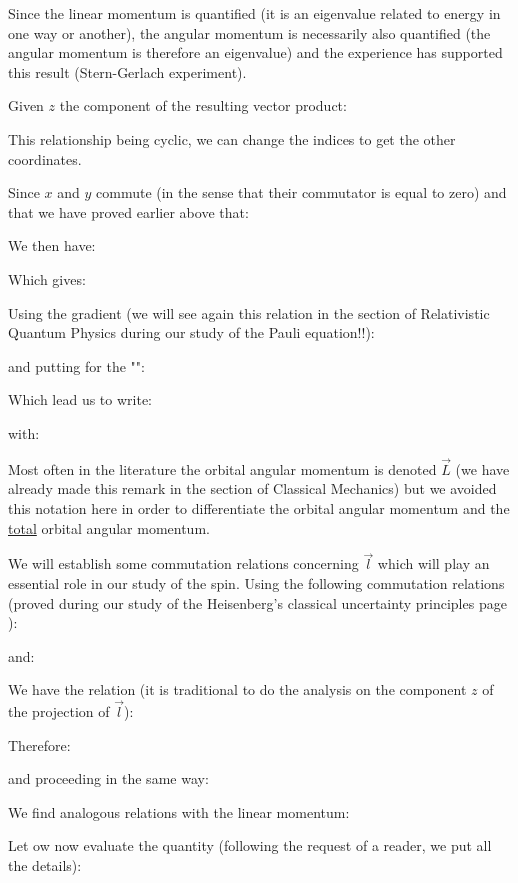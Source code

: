 	Since the linear momentum is quantified (it is an eigenvalue related to energy in one way or another), the angular momentum is necessarily also quantified (the angular momentum is therefore an eigenvalue) and the experience has supported this result (Stern-Gerlach experiment).

	Given $z$ the component of the resulting vector product:
	
	This relationship being cyclic, we can change the indices to get the other coordinates.

	Since $x$ and $y$ commute (in the sense that their commutator is equal to zero) and that we have proved earlier above that:
	
	We then have:
	
	Which gives:
	
	Using the gradient (we will see again this relation in the section of Relativistic Quantum Physics during our study of the Pauli equation!!):
	
	and putting for the "":
	
	Which lead us to write:
	
	with:
	
	\begin{tcolorbox}[title=Remark,colframe=black,arc=10pt]
	Most often in the literature the orbital angular momentum is denoted $\vec{L}$ (we have already made this remark in the section of Classical Mechanics) but we avoided this notation here in order to differentiate the orbital angular momentum and the \underline{total} orbital angular momentum.
	\end{tcolorbox}
	We will establish some commutation relations concerning $\vec{l}$ which will play an essential role in our study of the spin. Using the following commutation relations (proved during our study of the Heisenberg's classical uncertainty principles page \pageref{heisenberg uncertainty principle}):
	
	and:
	
	We have the relation (it is traditional to do the analysis on the component $z$ of the projection of $\vec{l}$):
	
	Therefore:
	
	and proceeding in the same way:
	
	\begin{tcolorbox}[title=Remark,colframe=black,arc=10pt]
	We find analogous relations with the linear momentum:
	
	\end{tcolorbox}
	Let ow now evaluate the quantity (following the request of a reader, we put all the details):
	
